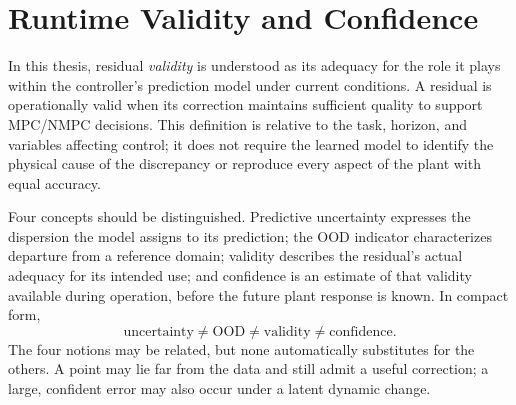 \documentclass[12pt,a4paper]{report}
\begin{document}

\section{Runtime Validity and Confidence}
\label{sec:validez_confianza_operacion}

%
%
%
%
%

In this thesis, residual \emph{validity} is understood as its adequacy for the role it plays within the controller's prediction model under current conditions. A residual is operationally valid when its correction maintains sufficient quality to support MPC/NMPC decisions. This definition is relative to the task, horizon, and variables affecting control; it does not require the learned model to identify the physical cause of the discrepancy or reproduce every aspect of the plant with equal accuracy.

Four concepts should be distinguished. Predictive uncertainty expresses the dispersion the model assigns to its prediction; the OOD indicator characterizes departure from a reference domain; validity describes the residual's actual adequacy for its intended use; and confidence is an estimate of that validity available during operation, before the future plant response is known. In compact form,
\begin{equation}
    \mathrm{uncertainty}
    \neq
    \mathrm{OOD}
    \neq
    \mathrm{validity}
    \neq
    \mathrm{confidence}.
    \label{eq:uncertainty_ood_validity_confidence}
\end{equation}
The four notions may be related, but none automatically substitutes for the others. A point may lie far from the data and still admit a useful correction; a large, confident error may also occur under a latent dynamic change.
\end{document}
